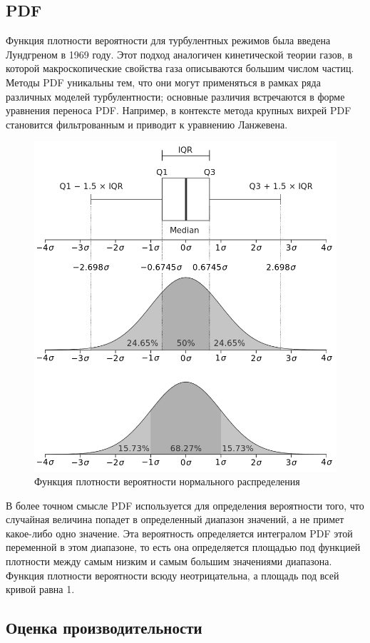 \subsection{PDF}
	Функция плотности вероятности для турбулентных режимов была введена Лундгреном в 1969 году\cite{Lundgren1969}. Этот подход аналогичен кинетической теории газов, в которой макроскопические свойства газа описываются большим числом частиц. Методы PDF уникальны тем, что они могут применяться в рамках ряда различных моделей турбулентности; основные различия встречаются в форме уравнения переноса PDF. Например, в контексте метода крупных вихрей PDF становится фильтрованным и приводит к уравнению Ланжевена.
	\begin{figure}[H]
		\centering
		\includegraphics[width=0.7\linewidth]{../Assets/pdfplot}
		\caption{Функция плотности вероятности нормального распределения}
		\label{fig:pdfplot}
	\end{figure}
	В более точном смысле PDF используется для определения вероятности того, что случайная величина попадет в определенный диапазон значений, а не примет какое-либо одно значение. Эта вероятность определяется интегралом PDF этой переменной в этом диапазоне, то есть она определяется площадью под функцией плотности между самым низким и самым большим значениями диапазона. Функция плотности вероятности всюду неотрицательна, а площадь под всей кривой равна 1.
\subsection{Оценка производительности}
	
